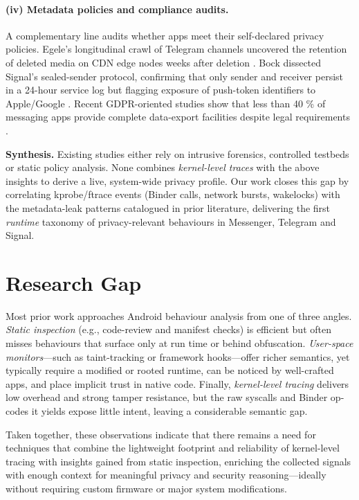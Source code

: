 \documentclass[a4paper,12pt]{report}
\begin{document}
\paragraph{(iv) Metadata policies and compliance audits.}
A complementary line audits whether apps meet their self-declared privacy
policies.  Egele’s longitudinal crawl of Telegram channels uncovered the
retention of deleted media on CDN edge nodes weeks after deletion
\cite{egele2019cdn}.
Bock dissected Signal’s sealed-sender protocol, confirming that only
sender and receiver persist in a 24-hour service log but flagging
exposure of push-token identifiers to Apple/Google \cite{bock2020sealed}.
Recent GDPR-oriented studies show that less than 40 \% of messaging apps
provide complete data-export facilities despite legal requirements
\cite{frolov2022gdpr}.


\medskip
\noindent\textbf{Synthesis.}
Existing studies either rely on intrusive forensics, controlled testbeds
or static policy analysis.  None combines \emph{kernel-level traces} with
the above insights to derive a live, system-wide privacy profile.
Our work closes this gap by correlating kprobe/ftrace events
(Binder calls, network bursts, wakelocks) with the metadata-leak patterns
catalogued in prior literature, delivering the first \emph{runtime}
taxonomy of privacy-relevant behaviours in Messenger, Telegram and Signal.

\section{Research Gap}\label{sec:rw:gap}
Most prior work approaches Android behaviour analysis from one of three angles.
\emph{Static inspection} (e.g., code-review and manifest checks) is efficient but often misses behaviours that surface only at run time or behind obfuscation.
\emph{User-space monitors}—such as taint-tracking or framework hooks—offer richer semantics, yet typically require a modified or rooted runtime, can be noticed by well-crafted apps, and place implicit trust in native code.
Finally, \emph{kernel-level tracing} delivers low overhead and strong tamper resistance, but the raw syscalls and Binder op-codes it yields expose little intent, leaving a considerable semantic gap.

Taken together, these observations indicate that there remains a need for techniques that combine the lightweight footprint and reliability of kernel-level tracing with insights gained from static inspection, enriching the collected signals with enough context for meaningful privacy and security reasoning—ideally without requiring custom firmware or major system modifications.
\end{document}
